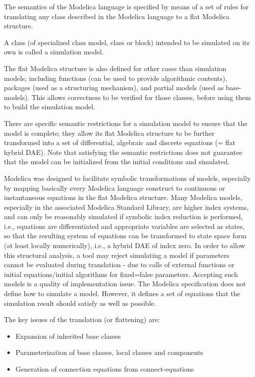 \documentclass[10pt,a4paper]{report}
\begin{document}
The semantics of the Modelica language is specified by means of a set of
rules for translating any class described in the Modelica language to a
flat Modelica structure.

A class (of specialized class model, class or block) intended to be
simulated on its own is called a simulation model.

The flat Modelica structure is also defined for other cases than
simulation models; including functions (can be used to provide
algorithmic contents), packages (used as a structuring mechanism), and
partial models (used as base-models). This allows correctness to be
verified for those classes, before using them to build the simulation
model.

There are specific semantic restrictions for a simulation model to
ensure that the model is complete; they allow its flat Modelica
structure to be further transformed into a set of differential,
algebraic and discrete equations (= flat hybrid DAE). Note that
satisfying the semantic restrictions does not guarantee that the model
can be initialized from the initial conditions and simulated.

Modelica was designed to facilitate symbolic transformations of models,
especially by mapping basically every Modelica language construct to
continuous or instantaneous equations in the flat Modelica structure.
Many Modelica models, especially in the associated Modelica Standard
Library, are higher index systems, and can only be reasonably simulated
if symbolic index reduction is performed, i.e., equations are
differentiated and appropriate variables are selected as states, so that
the resulting system of equations can be transformed to state space form
(at least locally numerically), i.e., a hybrid DAE of index zero. In
order to allow this structural analysis, a tool may reject simulating a
model if parameters cannot be evaluated during translation - due to
calls of external functions or initial equations/initial algorithms for
fixed=false parameters. Accepting such models is a quality of
implementation issue. The Modelica specification does not define how to
simulate a model. However, it defines a set of equations that the
simulation result should satisfy as well as possible.

The key issues of the translation (or flattening) are:

\begin{itemize}
\item
  Expansion of inherited base classes
\item
  Parameterization of base classes, local classes and components
\item
  Generation of connection equations from connect-equations
\end{itemize}
\end{document}
